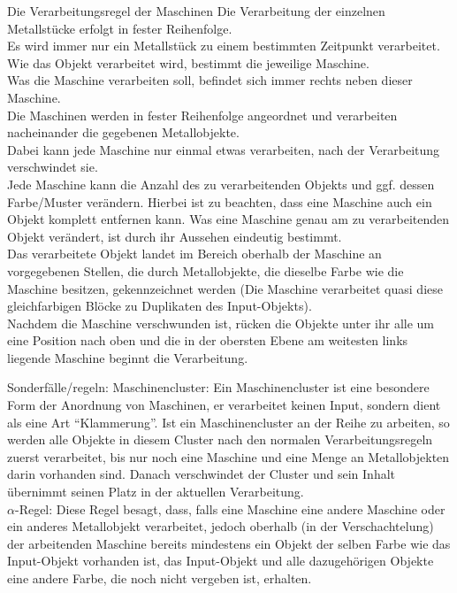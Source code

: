 \documentclass{scrartcl}
\begin{document}
\begin{description}
\begin{minipage}{1\textwidth}
	\item[Die Verarbeitungsregel der Maschinen] Die Verarbeitung der einzelnen Metallstücke erfolgt in fester Reihenfolge.\\
	Es wird immer nur ein Metallstück zu einem bestimmten Zeitpunkt verarbeitet.\\
	Wie das Objekt verarbeitet wird, bestimmt die jeweilige Maschine.\\
	Was die Maschine verarbeiten soll, befindet sich immer rechts neben dieser Maschine.\\
	Die Maschinen werden in fester Reihenfolge angeordnet und verarbeiten nacheinander die gegebenen Metallobjekte.\\
	Dabei kann jede Maschine nur einmal etwas verarbeiten, nach der Verarbeitung verschwindet sie.\\
	Jede Maschine kann die Anzahl des zu verarbeitenden Objekts und ggf. dessen Farbe/Muster verändern. Hierbei ist zu beachten, dass eine Maschine auch ein Objekt komplett entfernen kann. Was eine Maschine genau am zu verarbeitenden Objekt verändert, ist durch ihr Aussehen eindeutig bestimmt.\\
	Das verarbeitete Objekt landet im Bereich oberhalb der Maschine an vorgegebenen Stellen, die durch Metallobjekte, die dieselbe Farbe wie die Maschine besitzen, gekennzeichnet werden (Die Maschine verarbeitet quasi diese gleichfarbigen Blöcke zu Duplikaten des Input-Objekts).\\
	Nachdem die Maschine verschwunden ist, rücken die Objekte unter ihr alle um eine Position nach oben und die in der obersten Ebene am weitesten links liegende Maschine beginnt die Verarbeitung.\\
\end{minipage}	
	
\begin{minipage}{1\textwidth}
	\item[Sonderfälle/regeln:] Maschinencluster: Ein Maschinencluster ist eine besondere Form der Anordnung von Maschinen, er verarbeitet keinen Input, sondern dient als eine Art \enquote{Klammerung}. Ist ein Maschinencluster an der Reihe zu arbeiten, so werden alle Objekte in diesem Cluster nach den normalen Verarbeitungsregeln zuerst verarbeitet, bis nur noch eine Maschine und eine Menge an Metallobjekten darin vorhanden sind. Danach verschwindet der Cluster und sein Inhalt übernimmt seinen Platz in der aktuellen Verarbeitung.\\
	$\alpha$-Regel: Diese Regel besagt, dass, falls eine Maschine eine andere Maschine oder ein anderes Metallobjekt verarbeitet, jedoch oberhalb (in der Verschachtelung) der arbeitenden Maschine bereits mindestens ein Objekt der selben Farbe wie das Input-Objekt vorhanden ist, das Input-Objekt und alle dazugehörigen Objekte eine andere Farbe, die noch nicht vergeben ist, erhalten.\\
\end{minipage}

\end{description}
\end{document}
